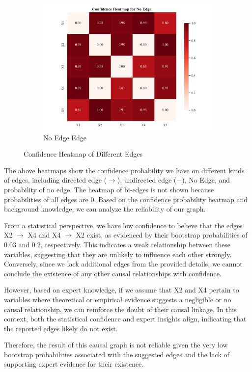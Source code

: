 \documentclass{article}
\begin{document}
\begin{figure}[H]
    \begin{subfigure}{0.32\textwidth}
        \centering
        \includegraphics[width=\linewidth]{./demo_data/20241104_155051/Linear_Gaussian_data/output_graph/non_existence_confidence_heatmap.jpg}
        \caption{No Edge Edge}
    \end{subfigure}
    \caption{Confidence Heatmap of Different Edges}
\end{figure}        
The above heatmaps show the confidence probability we have on different kinds of edges, including directed edge ($\rightarrow$), undirected edge ($-$), No Edge, and probability of no edge. The heatmap of bi-edges is not shown because probabilities of all edges are 0. Based on the confidence probability heatmap and background knowledge, we can analyze the reliability of our graph.

From a statistical perspective, we have low confidence to believe that the edges X2 $\rightarrow$ X4 and X4 $\rightarrow$ X2 exist, as evidenced by their bootstrap probabilities of 0.03 and 0.2, respectively. This indicates a weak relationship between these variables, suggesting that they are unlikely to influence each other strongly. Conversely, since we lack additional edges from the provided details, we cannot conclude the existence of any other causal relationships with confidence.

However, based on expert knowledge, if we assume that X2 and X4 pertain to variables where theoretical or empirical evidence suggests a negligible or no causal relationship, we can reinforce the doubt of their causal linkage. In this context, both the statistical confidence and expert insights align, indicating that the reported edges likely do not exist.

Therefore, the result of this causal graph is not reliable given the very low bootstrap probabilities associated with the suggested edges and the lack of supporting expert evidence for their existence.
\end{document}
